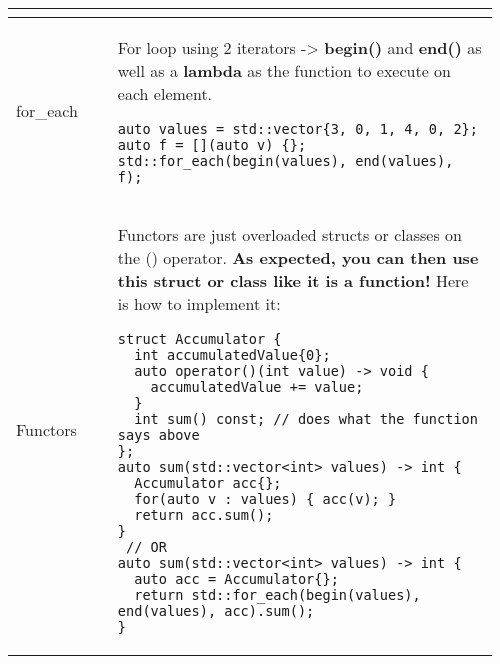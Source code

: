 \documentclass[main.tex,fontsize=8pt,paper=a4,paper=portrait,DIV=calc,]{scrartcl}
\begin{document}
\begin{table}[ht!]
\begin{tabular}{|m{0.2\linewidth}|m{0.755\linewidth}|}
\begin{itemize}
\vspace{-3mm}
\end{itemize} 
\\
\hline
for\_each & 
For loop using 2 iterators -> \textbf{begin()} and \textbf{end()} as well as a \textbf{lambda} as the function to execute on each element.\newline
\begin{lstlisting}
auto values = std::vector{3, 0, 1, 4, 0, 2};
auto f = [](auto v) {};
std::for_each(begin(values), end(values), f);
\end{lstlisting}\\
\hline
Functors & 
Functors are just overloaded structs or classes on the () operator.\newline
\textbf{As expected, you can then use this struct or class like it is a function!}\newline
Here is how to implement it:\newline 
\begin{lstlisting}
struct Accumulator {
  int accumulatedValue{0};
  auto operator()(int value) -> void {
    accumulatedValue += value;
  }
  int sum() const; // does what the function says above
};
auto sum(std::vector<int> values) -> int {
  Accumulator acc{};
  for(auto v : values) { acc(v); }
  return acc.sum();
}
 // OR
auto sum(std::vector<int> values) -> int {
  auto acc = Accumulator{};
  return std::for_each(begin(values), end(values), acc).sum();
}
\end{lstlisting}\\
\hline
\end{tabular}
\end{table}
\pagebreak
\end{document}

